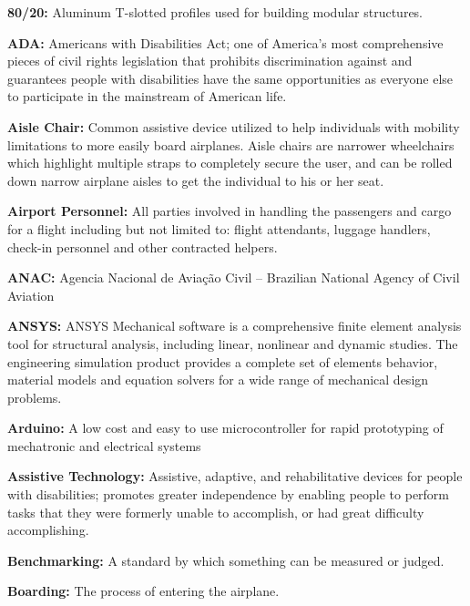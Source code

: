   \item  \textbf{80/20:} Aluminum T-slotted profiles used for building modular structures. 

\item  \textbf{ADA:} Americans with Disabilities Act; one of America's most comprehensive pieces of civil rights legislation that prohibits discrimination against and guarantees people with disabilities have the same opportunities as everyone else to participate in the mainstream of American life.

 \item \textbf{Aisle Chair:} Common assistive device utilized to help individuals with mobility limitations to more easily board airplanes. Aisle chairs are narrower wheelchairs which highlight multiple straps to completely secure the user, and can be rolled down narrow airplane aisles to get the individual to his or her seat. 

  \item \textbf{Airport Personnel:} All parties involved in handling the passengers and cargo for a flight including but not limited to: flight attendants, luggage handlers, check-in personnel and other contracted helpers.

  \item \textbf{ANAC:} Agencia Nacional de Aviação Civil – Brazilian National Agency of Civil Aviation

  \item \textbf{ANSYS:} ANSYS Mechanical software is a comprehensive finite element analysis tool for structural analysis, including linear, nonlinear and dynamic studies. The engineering simulation product provides a complete set of elements behavior, material models and equation solvers for a wide range of mechanical design problems.

\item \textbf{Arduino:} A low cost and easy to use microcontroller for rapid prototyping of mechatronic and electrical systems

  \item  \textbf{Assistive Technology:} Assistive, adaptive, and rehabilitative devices for people with disabilities; promotes greater independence by enabling people to perform tasks that they were formerly unable to accomplish, or had great difficulty accomplishing.

  \item  \textbf{Benchmarking:} A standard by which something can be measured or judged.

\item \textbf{Boarding:} The process of entering the airplane.

